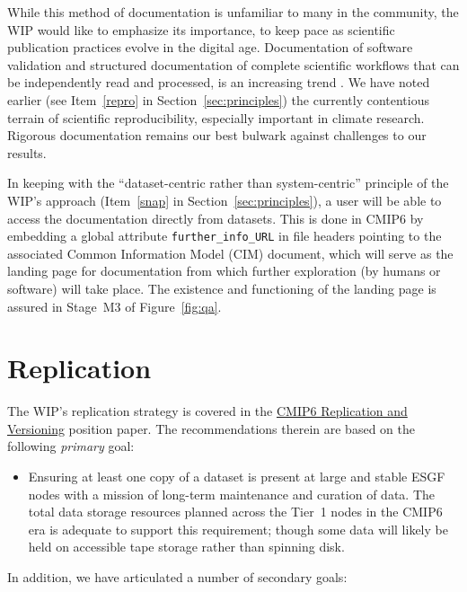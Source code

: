 \documentclass[gmd,manuscript]{copernicus}
\newcommand{\figref}[1] {\mbox{Figure   \ref{fig:#1}}}
\newcommand{\secref}[1] {\mbox{Section  \ref{sec:#1}}}
\begin{document}
While this method of documentation is unfamiliar to many in the
community, the WIP would like to emphasize its importance, to keep
pace as scientific publication practices evolve in the digital age.
Documentation of software validation \citep[see e.g][]{ref:peng2011}
and structured documentation of complete scientific workflows that can
be independently read and processed, is an increasing trend \citep[see
the special issue on the ``Geoscience Paper of the Future'',
][]{ref:davidetal2016}. We have noted earlier (see Item~\ref{repro} in
\secref{principles}) the currently contentious terrain of scientific
reproducibility, especially important in climate research. Rigorous
documentation remains our best bulwark against challenges to our results.

In keeping with the ``dataset-centric rather than system-centric''
principle of the WIP's approach (Item~\ref{snap} in
\secref{principles}), a user will be able to access the documentation
directly from datasets. This is done in CMIP6 by embedding a global
attribute \texttt{further\_info\_URL} in file headers pointing to the
associated Common Information Model (CIM) 
document, which will serve as the landing page for
documentation from which further exploration (by humans or software)
will take place. The existence and functioning of the landing page is
assured in Stage~M3 of \figref{qa}.

\section{Replication}
\label{sec:replica}

The WIP's replication strategy is covered in the
\href{https://goo.gl/Bs4Qou}{CMIP6 Replication and Versioning}
position paper. The recommendations therein are based on the following
\emph{primary} goal:

\begin{itemize}
\item Ensuring at least one copy of a dataset is present at large and
  stable ESGF nodes with a mission of long-term maintenance and
  curation of data. The total data storage resources planned across
  the Tier~1 nodes in the CMIP6 era is adequate to support this
  requirement; though some data will likely be held on accessible tape
  storage rather than spinning disk.
\end{itemize}

In addition, we have articulated a number of secondary goals:
\end{document}
